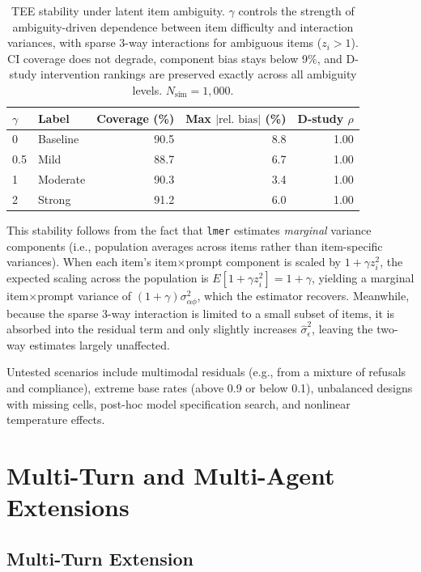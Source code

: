 \begin{table}[h]
\centering
\small
\caption{TEE stability under latent item ambiguity. $\gamma$ controls the strength of ambiguity-driven dependence between item difficulty and interaction variances, with sparse 3-way interactions for ambiguous items ($z_i > 1$). CI coverage does not degrade, component bias stays below 9\%, and D-study intervention rankings are preserved exactly across all ambiguity levels. $N_\text{sim} = 1,000$.}
\label{tab:latent_ambiguity}
\begin{tabular}{llrrr}
\toprule
$\gamma$ & Label & Coverage (\%) & Max $|\text{rel.\ bias}|$ (\%) & D-study $\rho$ \\
\midrule
0   & Baseline    & 90.5 & 8.8 & 1.00 \\
0.5 & Mild        & 88.7 & 6.7 & 1.00 \\
1   & Moderate    & 90.3 & 3.4 & 1.00 \\
2   & Strong      & 91.2 & 6.0 & 1.00 \\
\bottomrule
\end{tabular}
\end{table}

This stability follows from the fact that \texttt{lmer} estimates \emph{marginal} variance components (i.e., population averages across items rather than item-specific variances). When each item's item$\times$prompt component is scaled by $1 + \gamma z_i^2$, the expected scaling across the population is $E[1 + \gamma z_i^2] = 1 + \gamma$, yielding a marginal item$\times$prompt variance of $(1 + \gamma)\sigma^2_{\alpha\phi}$, which the estimator recovers. Meanwhile, because the sparse 3-way interaction is limited to a small subset of items, it is absorbed into the residual term and only slightly increases $\hat{\sigma}^2_\epsilon$, leaving the two-way estimates largely unaffected.

Untested scenarios include multimodal residuals (e.g., from a mixture of refusals and compliance), extreme base rates (above 0.9 or below 0.1), unbalanced designs with missing cells, post-hoc model specification search, and nonlinear temperature effects.



\clearpage

\section{Multi-Turn and Multi-Agent Extensions}
\label{si:extensions}

\subsection{Multi-Turn Extension}

